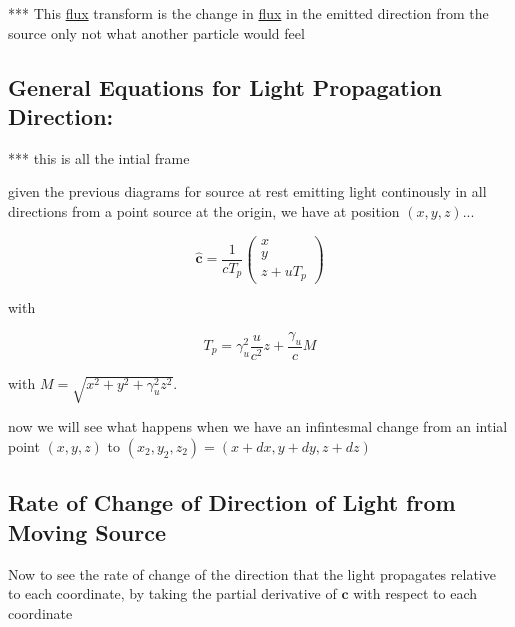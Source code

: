*** This \hyperlink{def-flux}{flux} transform is the change in \hyperlink{def-flux}{flux} in the emitted direction from the source only not what another particle would feel

\subsection{General Equations for Light Propagation Direction:}

*** this is all the intial frame

given the previous diagrams for source at rest emitting light continously in all directions from a point source at the origin, we have at position $(x,y,z)$...

\begin{equation}
	\mathbf{\hat{c}} = \frac{1}{c T_{p}}
	\begin{pmatrix}
		x \\
		y \\
		z + u T_{p}
	\end{pmatrix}
\end{equation}

with

\begin{equation}
	T_{p} = \gamma_u^2 \frac{u}{c^2}z + \frac{\gamma_u}{c} M
\end{equation}


with $M=\sqrt{x^2 + y^2 + \gamma_u^2 z^2}$.

now we will see what happens when we have an infintesmal change from an intial point $(x,y,z)$ to $(x_2,y_2,z_2)=(x +dx,y+dy,z+dz)$


\subsection{Rate of Change of Direction of Light from Moving Source}\label{subsect: Rate of Change of Direction of Absorbed Light from Moving Source}


Now to see the rate of change of the direction that the light propagates relative to each coordinate, by taking the partial derivative of $\mathbf{\hat{c}}$ with respect to each coordinate

